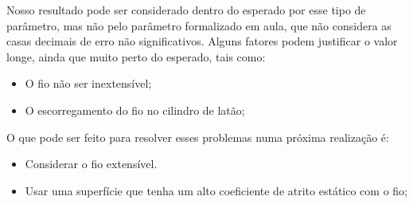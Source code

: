 \documentclass[a4paper]{article}
\begin{document}
Nosso resultado pode ser considerado dentro do esperado por esse tipo de parâmetro, mas não pelo parâmetro formalizado em aula, que não considera as casas decimais de erro não significativos. Alguns fatores podem justificar o valor longe, ainda que muito perto do esperado, tais como:
\begin{itemize}
	\item O fio não ser inextensível;
	\item O escorregamento do fio no cilindro de latão;
\end{itemize}

O que pode ser feito para resolver esses problemas numa próxima realização é:
\begin{itemize}
	\item Considerar o fio extensível.
	\item Usar uma superfície que tenha um alto coeficiente de atrito estático com o fio;
\end{itemize}
\end{document}
